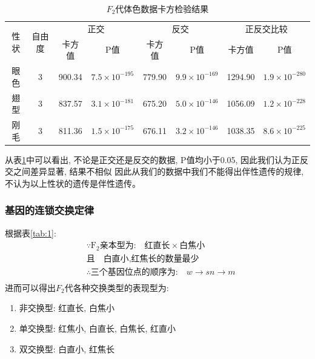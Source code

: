 \documentclass[AutoFakeBold]{LZUThesis}
\begin{document}
\begin{table}[hbtp]
    \centering
    \caption{$F_2$代体色数据卡方检验结果}
    \begin{tabular}{cccccccc}
        \toprule
        \multirow{2}{*}{性状} & \multirow{2}{*}{自由度}& \multicolumn{2}{c}{正交} & \multicolumn{2}{c}{反交} & \multicolumn{2}{c}{正反交比较} \\
        \cmidrule(lr){3-4} \cmidrule(lr){5-6} \cmidrule(lr){7-8}
        & & 卡方值 & P值 & 卡方值 & P值 & 卡方值 & P值 \\
        \midrule
        眼色 & 3 & 900.34 & $7.5\times 10^{-195}$ & 779.90 & $9.9\times 10^{-169}$ & 1294.90 & $1.9\times 10^{-280}$ \\
        翅型 & 3 & 837.57 & $3.1\times 10^{-181}$ & 675.20 & $5.0\times 10^{-146}$ & 1056.09 & $1.2\times 10^{-228}$ \\
        刚毛 & 3 & 811.36 & $1.5\times 10^{-175}$ & 676.11 & $3.2\times 10^{-146}$ & 1038.35 & $8.6\times 10^{-225}$ \\
        \bottomrule
    \end{tabular}
    \label{tab:6}
\end{table}

从表\ref{tab:6}中可以看出, 不论是正交还是反交的数据, P值均小于0.05, 因此我们认为正反交之间差异显著, 结果不相似
因此从我们的数据中我们不能得出伴性遗传的规律, 不认为以上性状的遗传是伴性遗传。

\subsubsection{基因的连锁交换定律}
\hspace{2em}根据表\ref{tab:1}:
\begin{align*}
    &\because \text{F}_2 \text{亲本型为:} \quad \text{红直长} \times \text{白焦小} \\
    &\text{且} \quad \text{白直小}, \text{红焦长的数量最少} \\
    &\therefore \text{三个基因位点的顺序为:} \quad w \rightarrow sn \rightarrow m \\
\end{align*}
\hspace{2em}进而可以得出$F_2$代各种交换类型的表现型为:
\begin{enumerate}[leftmargin=4em]
    \item 非交换型: 红直长, 白焦小 \par
    \item 单交换型: 红焦小, 白直长, 白焦长, 红直小 \par
    \item 双交换型: 白直小, 红焦长 \par
\end{enumerate}
\end{document}
